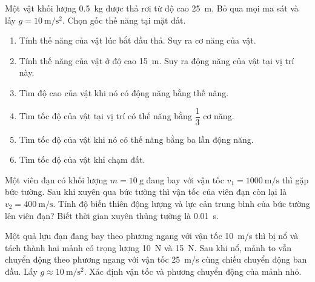 \begin{ex}
	Một vật khối lượng \SI{0.5}{\kilogram} được thả rơi từ độ cao \SI{25}{\meter}. Bỏ qua mọi ma sát và lấy $g=\SI{10}{\meter/\second^2}$. Chọn gốc thế năng tại mặt đất.
	\begin{enumerate}[label=\alph*)]
		\item Tính thế năng của vật lúc bắt đầu thả. Suy ra cơ năng của vật.
		\item Tính thế năng của vật ở độ cao \SI{15}{\meter}. Suy ra động năng của vật tại vị trí này.
		\item Tìm độ cao của vật khi nó có động năng bằng thế năng.
		\item Tìm tốc độ của vật tại vị trí có thế năng bằng $\dfrac{1}{3}$ cơ năng.
		\item Tìm tốc độ của vật khi nó có thế năng bằng ba lần động năng.
		\item Tìm tốc độ của vật khi chạm đất.
	\end{enumerate}
	\loigiai{
		
	}
\end{ex}
%		
\begin{ex}
	Một viên đạn có khối lượng $m = \SI{10}{\gram}$ đang bay với vận tốc $v_1=\SI{1000}{\meter/\second}$  thì gặp bức tường. Sau khi xuyên qua bức tường thì vận tốc của viên đạn còn lại là $v_2=\SI{400}{\meter/\second}$. Tính độ biến thiên động lượng và lực cản trung bình của bức tường lên viên đạn? Biết thời gian xuyên thủng tường là \SI{0.01}{\second}.
	\loigiai{
		
	}
\end{ex}
\begin{ex}
	Một quả lựu đạn đang bay theo phương ngang với vận tốc \SI{10}{\meter/\second} thì bị nổ và tách thành hai mảnh có trọng lượng \SI{10}{\newton} và \SI{15}{\newton}. Sau khi nổ, mảnh to vẫn chuyển động theo phương ngang với vận tốc \SI{25}{\meter/\second} cùng chiều chuyển động ban đầu. Lấy $g\approx\SI{10}{\meter/\second^2}$. Xác định vận tốc và phương chuyển động của mảnh nhỏ.
	\loigiai{
		
	}
\end{ex}
